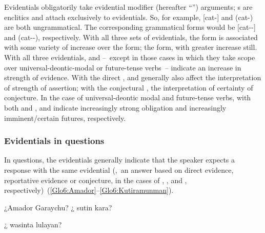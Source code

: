 Evidentials obligatorily take evidential modifier (hereafter “”) arguments; s are enclitics and attach exclusively to evidentials. So, for example,  [cat-] and  (cat-) are both ungrammatical. The corresponding grammatical forms would be  [cat--\uo] and  (cat--), respectively. With all three sets of evidentials, the  form is associated with some variety of increase over the \phono{-\uo} form; the  form, with greater increase still. With all three evidentials,  and  --~except in those cases in which they take scope over universal-deontic-modal or future-tense verbs~-- indicate an increase in strength of evidence. With the direct ,  and  generally also affect the interpretation of strength of assertion; with the conjectural , the interpretation of certainty of conjecture. In the case of universal-deontic modal and future-tense verbs, with both  and ,  and  indicate increasingly strong obligation and increasingly imminent/certain futures, respectively.

\subsubsection{Evidentials in questions}
In questions, the evidentials generally indicate that the speaker expects a response with the same evidential (\ie,~an answer based on direct evidence, reportative evidence or conjecture, in the cases of , , and , respectively)~(\ref{Glo6:Amador}--\ref{Glo6:Kutiramunman}).


%
{¿Amador Garaychu? ¿ sutin kara?}%
{}%
{}{}%

%
{¿ wasinta lulayan?}%
{}%
{}{}%

